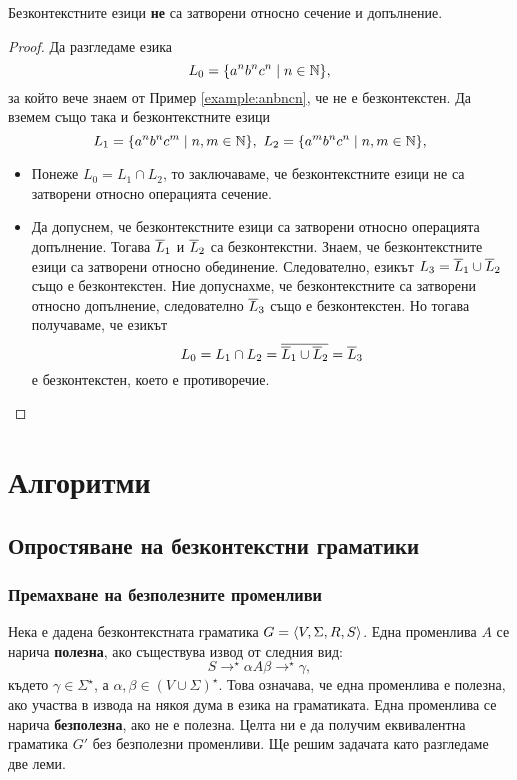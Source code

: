 \begin{thm}
  Безконтекстните езици {\bf не} са затворени относно сечение и допълнение.
\end{thm}
\begin{proof}
  Да разгледаме езика
  \[L_0 = \{a^nb^nc^n\mid n\in\mathbb{N}\},\] за който вече знаем от Пример \ref{example:anbncn}, че не е безконтекстен.
  Да вземем също така и безконтекстните езици 
  \[L_1 = \{a^nb^nc^m\mid n,m\in\mathbb{N}\},\ L_2 = \{a^mb^nc^n\mid n,m\in\mathbb{N}\},\]
  \begin{itemize}
  \item 
    Понеже $L_0 = L_1\cap L_2$, то заключаваме, че безконтекстните езици не са затворени 
    относно операцията сечение.
  \item
    Да допуснем, че безконтекстните езици са затворени относно операцията допълнение.
    Тогава  $\overline{L}_1$ и $\overline{L}_2$ са безконтекстни.
    Знаем, че безконтекстните езици са затворени относно обединение. 
    Следователно, езикът $L_3 = \overline{L}_1 \cup \overline{L}_2$ също е безконтекстен.
    Ние допуснахме, че безконтекстните са затворени относно допълнение, следователно $\overline{L}_3$
    също е безконтекстен.
    Но тогава получаваме, че езикът
    \[L_0 = L_1 \cap L_2 = \overline{\overline{L}_1 \cup \overline{L}_2} = \overline{L}_3\]
    е безконтекстен, което е противоречие.
  \end{itemize}
\end{proof}


\section{Алгоритми}

\subsection{Опростяване на безконтекстни граматики}

\subsubsection*{Премахване на безполезните променливи}

Нека е дадена безконтекстната граматика $G = \langle{V,\Sigma,R,S}\rangle$.
Една променлива $A$ се нарича {\bf полезна}, ако съществува извод от следния вид:
\[S \to^\star \alpha A \beta \to^\star \gamma,\]
където $\gamma \in \Sigma^\star$, а $\alpha,\beta \in (V \cup \Sigma)^\star$.
Това означава, че една променлива е полезна, ако участва в извода на някоя дума в езика на граматиката.
Една променлива се нарича {\bf безполезна}, ако не е полезна.
Целта ни е да получим еквивалентна граматика $G'$ без безполезни променливи.
Ще решим задачата като разгледаме две леми.

